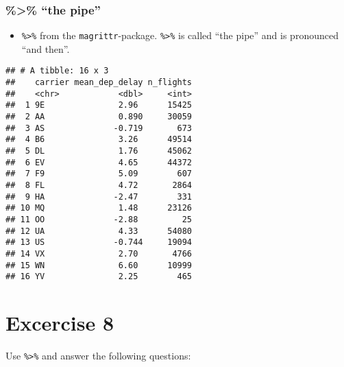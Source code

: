 \documentclass[]{book}
\newenvironment{Shaded}{\begin{snugshade}}{\end{snugshade}}
\newcommand{\DataTypeTok}[1]{\textcolor[rgb]{0.13,0.29,0.53}{#1}}
\newcommand{\DecValTok}[1]{\textcolor[rgb]{0.00,0.00,0.81}{#1}}
\newcommand{\KeywordTok}[1]{\textcolor[rgb]{0.13,0.29,0.53}{\textbf{#1}}}
\newcommand{\NormalTok}[1]{#1}
\newcommand{\OperatorTok}[1]{\textcolor[rgb]{0.81,0.36,0.00}{\textbf{#1}}}
\newcommand{\StringTok}[1]{\textcolor[rgb]{0.31,0.60,0.02}{#1}}
\providecommand{\tightlist}{%
  \setlength{\itemsep}{0pt}\setlength{\parskip}{0pt}}
\begin{document}
\hypertarget{the-pipe}{%
\subsubsection{\%\textgreater{}\% ``the pipe''}\label{the-pipe}}

\begin{itemize}
\tightlist
\item
  \texttt{\%\textgreater{}\%} from the \texttt{magrittr}-package. \texttt{\%\textgreater{}\%} is called ``the pipe'' and is pronounced ``and then''.
\end{itemize}

\begin{Shaded}
\end{Shaded}

\begin{verbatim}
## # A tibble: 16 x 3
##    carrier mean_dep_delay n_flights
##    <chr>            <dbl>     <int>
##  1 9E               2.96      15425
##  2 AA               0.890     30059
##  3 AS              -0.719       673
##  4 B6               3.26      49514
##  5 DL               1.76      45062
##  6 EV               4.65      44372
##  7 F9               5.09        607
##  8 FL               4.72       2864
##  9 HA              -2.47        331
## 10 MQ               1.48      23126
## 11 OO              -2.88         25
## 12 UA               4.33      54080
## 13 US              -0.744     19094
## 14 VX               2.70       4766
## 15 WN               6.60      10999
## 16 YV               2.25        465
\end{verbatim}

\hypertarget{excercise-8}{%
\section{Excercise 8}\label{excercise-8}}

Use \texttt{\%\textgreater{}\%} and answer the following questions:
\end{document}
